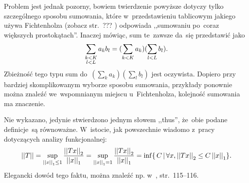 \documentclass[a4paper,11pt]{article}
\begin{document}
Problem jest jednak pozorny, bowiem twierdzenie powyższe dotyczy tylko
szczególnego sposobu sumowania, które w~przedstawieniu tablicowym
jakiego używa Fichtenholza (zobacz str.~??? \cite{Fichtenholz05a})
odpowiada ,,sumowaniu po~coraz większych prostokątach''. Inaczej
mówiąc, sum te~zawsze da~się przedstawić jako
\begin{equation*}
  \sum\limits_{ \substack{ k < K \\ l < L \\ } } a_{ k } b_{ l }
  = ( \sum\limits_{ k < K } a_{ k } ) ( \sum\limits_{ l < L } b_{ l } ).
\end{equation*}
Zbieżność tego typu sum
do~$( \sum_{ k } a_{ k } ) ( \sum_{ l } b_{ l } )$ jest oczywista.
Dopiero przy bardziej skomplikowanym wyborze sposobu sumowania,
przykłady ponownie można znaleźć we~wspomnianym miejscu
u~Fichtenholza, kolejność sumowania ma znaczenie. %

\vspace{\spaceTwo}




\noi {}

\vspace{\spaceFour}



\start {} Nie wykazano, jedynie stwierdzono jednym słowem
,,thus'', że~obie podane definicje~są równoważne. W~istocie, jak
powszechnie wiadomo z~pracy dotyczących analizy funkcjonalnej:
\begin{equation*}
  \left|\left|  T  \right|\right| = \sup_{ \left|\left|  x  \right|\right|_{ 1 } \leq 1 } \frac{ \left|\left|  T x  \right|\right|_{ 2 } }
  { \left|\left|  x  \right|\right|_{ 1 } }
  = \sup_{ \left|\left|  x  \right|\right|_{ 1 } = 1 } \frac{ \left|\left|  T x  \right|\right|_{ 2 } }
  { \left|\left|  x  \right|\right|_{ 1 } } = \inf \{ \, C \, | \, \forall x,
  \left|\left|  T x  \right|\right|_{ 2 } \leq C \left|\left|  x  \right|\right|_{ 1 } \}.
\end{equation*}
Elegancki dowód tego faktu, można znaleźć np.
w~\cite{ChmielinskiAnalizaFunkcjonalna04},
str.~115--116. %

\vspace{\spaceFour}
\end{document}
